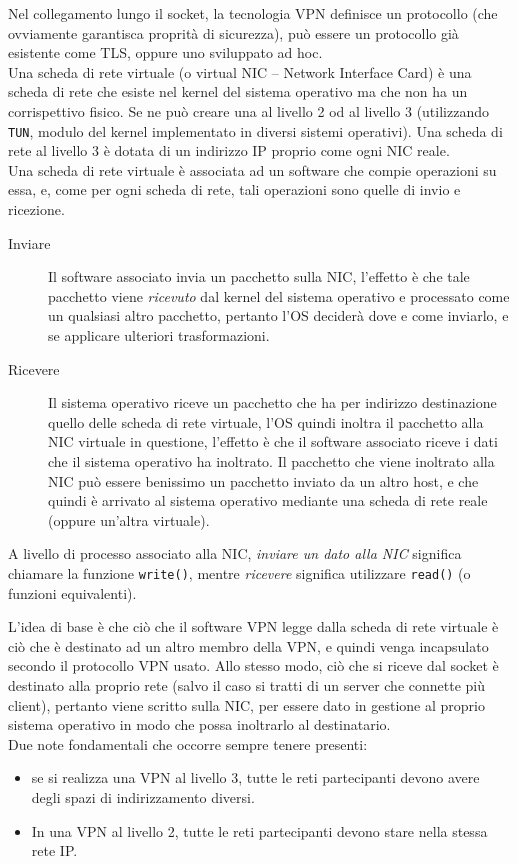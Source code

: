 Nel collegamento lungo il socket, la tecnologia VPN definisce un protocollo (che ovviamente
garantisca proprità di sicurezza), può essere un protocollo già esistente come TLS,
oppure uno sviluppato ad hoc.\\
Una scheda di rete virtuale (o virtual NIC -- Network Interface Card) è una
scheda di rete che esiste nel kernel del sistema
operativo ma che non ha un corrispettivo fisico. Se ne può creare una al livello 2
od al livello 3 (utilizzando \texttt{TUN}, modulo del
kernel implementato in diversi sistemi operativi). Una scheda di rete
al livello 3 è dotata di un indirizzo IP proprio come ogni NIC reale.\\
Una scheda di rete virtuale è associata ad un software che compie operazioni su essa,
e, come per ogni scheda di rete, tali operazioni sono quelle di invio e ricezione.
\begin{description}
	\item[Inviare]Il software associato invia un pacchetto sulla NIC, l'effetto è che tale
	pacchetto viene \textit{ricevuto} dal kernel del sistema operativo e processato
	come un qualsiasi altro pacchetto, pertanto l'OS deciderà
	dove e come inviarlo, e se applicare ulteriori trasformazioni.
	\item[Ricevere]Il sistema operativo riceve un pacchetto che ha per indirizzo destinazione
	quello delle scheda di rete virtuale, l'OS quindi inoltra il pacchetto alla NIC
	virtuale in questione, l'effetto è che il software associato riceve i dati
	che il sistema operativo ha inoltrato. Il pacchetto che viene inoltrato alla NIC
	può essere benissimo un pacchetto inviato da un altro host, e che quindi è arrivato
	al sistema operativo mediante una scheda di rete reale (oppure un'altra virtuale).
\end{description}
A livello di processo associato alla NIC, \textit{inviare un dato alla NIC} significa
chiamare la funzione \texttt{write()}, mentre \textit{ricevere} significa
utilizzare \texttt{read()} (o funzioni equivalenti).


L'idea di base è che ciò che il software VPN legge dalla scheda di rete virtuale
è ciò che è destinato ad un altro membro della VPN, e quindi venga incapsulato secondo
il protocollo VPN usato. Allo stesso modo, ciò che si riceve dal socket è destinato
alla proprio rete (salvo il caso si tratti di un server che connette più client), pertanto
viene scritto sulla NIC, per essere dato in gestione al proprio sistema operativo in
modo che possa inoltrarlo al destinatario.\\
Due note fondamentali che occorre sempre tenere presenti:
\begin{itemize}
	\item se si realizza una VPN al livello 3, tutte le reti partecipanti devono
	      avere degli spazi di indirizzamento diversi.
	\item In una VPN al livello 2, tutte le reti partecipanti devono stare
	      nella stessa rete IP.
\end{itemize}

